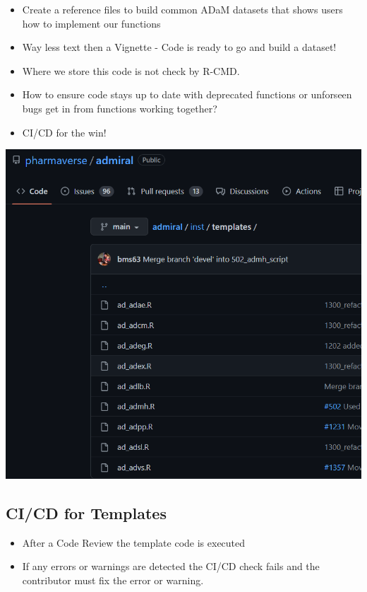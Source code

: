 \documentclass[
  letterpaper,
  DIV=11,
  numbers=noendperiod]{scrartcl}
\providecommand{\tightlist}{%
  \setlength{\itemsep}{0pt}\setlength{\parskip}{0pt}}\usepackage{longtable,booktabs,array}
\begin{document}
\begin{itemize}
\tightlist
\item
  Create a reference files to build common ADaM datasets that shows
  users how to implement our functions
\item
  Way less text then a Vignette - Code is ready to go and build a
  dataset!
\item
  Where we store this code is not check by R-CMD.
\item
  How to ensure code stays up to date with deprecated functions or
  unforseen bugs get in from functions working together?
\item
  CI/CD for the win!
\end{itemize}

\includegraphics{templates.png}

\hypertarget{cicd-for-templates}{%
\subsection{CI/CD for Templates}\label{cicd-for-templates}}

\begin{itemize}
\tightlist
\item
  After a Code Review the template code is executed
\item
  If any errors or warnings are detected the CI/CD check fails and the
  contributor must fix the error or warning.
\end{itemize}
\end{document}
